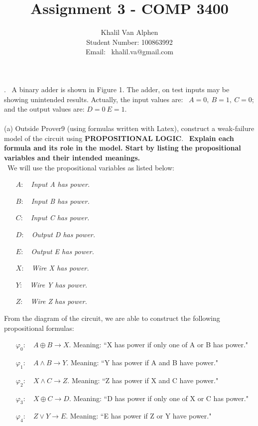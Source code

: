 \documentclass[fullpage]{article}
\title{\vspace*{-2cm}\bf Assignment 3 - COMP 3400}
\author{Khalil Van Alphen\\
Student Number: 100863992\\
Email: \  khalil.va@gmail.com}
\date{}
\begin{document}
\maketitle
\pagestyle{plain}
\thispagestyle{empty}

. \ A binary adder is shown in Figure 1. The adder, on test inputs may be showing
unintended  results. Actually, the input values are:
\ $A=0, \ B=1,\ C=0$; and the output values are: $D=0 \ E=1$.\\
\\
(a) Outside Prover9 (using formulas written with Latex), construct a weak-failure model of the circuit using {\bf PROPOSITIONAL LOGIC}.
\ {\bf Explain each formula and its role in the model. Start by listing the propositional variables and their intended meanings.}\\

 \ We will use the propositional variables as listed below:
\begin{itemize}
\item[$A$:]~ {\em Input A has power.}
\item[$B$:]~ {\em Input B has power.}
\item[$C$:]~ {\em Input C has power.}
\item[$D$:]~ {\em Output D has power.}
\item[$E$:]~ {\em Output E has power.}
\item[$X$:]~ {\em Wire X has power.}
\item[$Y$:]~ {\em Wire Y has power.}
\item[$Z$:]~ {\em Wire Z has power.}
\end{itemize}
From the diagram of the circuit, we are able to construct the following propositional formulas:
\begin{itemize}
\item[$\varphi_0$:]~ ${A \oplus B \rightarrow X}$.
 Meaning: ``X has power if only one of A or B has power."
 \item[$\varphi_1$:]~ ${A \wedge B \rightarrow Y}$.
 Meaning: ``Y has power if A and B have power."
 \item[$\varphi_2$:]~ ${X \wedge C \rightarrow Z}$.
 Meaning: ``Z has power if X and C have power."
\item[$\varphi_3$:]~ ${X \oplus C \rightarrow D}$.
 Meaning: ``D has power if only one of X or C has power."
\item[$\varphi_4$:]~ ${Z \vee Y \rightarrow E}$.
 Meaning: ``E has power if Z or Y have power."
\end{itemize}
\end{document}
